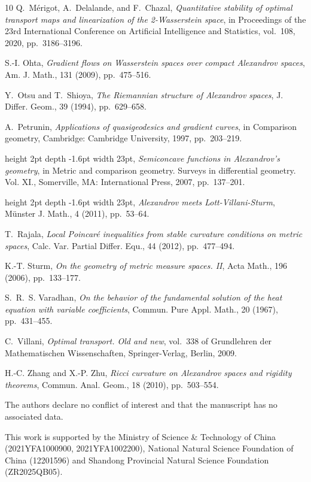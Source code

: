 \documentclass[a4paper,11pt]{article}
\numberwithin{equation}{section}
\theoremstyle{plain}
\theoremstyle{definition}
\theoremstyle{remark}
\begin{document}
\begin{thebibliography}{10}
{\sc Q.~Mérigot, A.~Delalande, and F.~Chazal}, {\em Quantitative stability of
  optimal transport maps and linearization of the 2-{Wasserstein} space}, in
  Proceedings of the 23rd International Conference on Artificial Intelligence
  and Statistics, vol.~108, 2020, pp.~3186--3196.

{\sc S.-I. Ohta}, {\em Gradient flows on {Wasserstein} spaces over compact
  {Alexandrov} spaces}, Am. J. Math., 131 (2009), pp.~475--516.

{\sc Y.~Otsu and T.~Shioya}, {\em The {Riemannian} structure of {Alexandrov}
  spaces}, J. Differ. Geom., 39 (1994), pp.~629--658.

{\sc A.~Petrunin}, {\em Applications of quasigeodesics and gradient curves}, in
  Comparison geometry, Cambridge: Cambridge University, 1997, pp.~203--219.

\leavevmode\vrule height 2pt depth -1.6pt width 23pt, {\em Semiconcave
  functions in {Alexandrov}'s geometry}, in Metric and comparison geometry.
  Surveys in differential geometry. Vol. XI., Somerville, MA: International
  Press, 2007, pp.~137--201.

\leavevmode\vrule height 2pt depth -1.6pt width 23pt, {\em Alexandrov meets
  {Lott}-{Villani}-{Sturm}}, M{\"u}nster J. Math., 4 (2011), pp.~53--64.

{\sc T.~Rajala}, {\em Local {Poincar{\'e}} inequalities from stable curvature
  conditions on metric spaces}, Calc. Var. Partial Differ. Equ., 44 (2012),
  pp.~477--494.

{\sc K.-T. Sturm}, {\em On the geometry of metric measure spaces. {II}}, Acta
  Math., 196 (2006), pp.~133--177.

{\sc S.~R.~S. Varadhan}, {\em On the behavior of the fundamental solution of
  the heat equation with variable coefficients}, Commun. Pure Appl. Math., 20
  (1967), pp.~431--455.

{\sc C.~Villani}, {\em Optimal transport. Old and new}, vol.~338 of Grundlehren
  der Mathematischen Wissenschaften, Springer-Verlag, Berlin, 2009.

{\sc H.-C. Zhang and X.-P. Zhu}, {\em Ricci curvature on {Alexandrov} spaces
  and rigidity theorems}, Commun. Anal. Geom., 18 (2010), pp.~503--554.

\end{thebibliography}

	
	
	
	
	\bigskip


 The authors declare no conflict of interest and that the manuscript has no associated data.
	
	\medskip
	
	 This work is supported by the Ministry of Science \& Technology of China (2021YFA1000900, 2021YFA1002200),  National Natural Science Foundation of China  (12201596)   and Shandong Provincial Natural Science Foundation (ZR2025QB05).  
	
	
\end{document}
